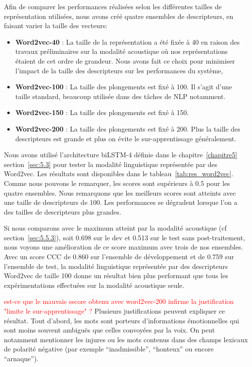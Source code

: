 Afin de comparer les performances réalisées selon les différentes tailles de représentation utilisées, nous avons créé quatre ensembles de descripteurs, en faisant varier la taille des vecteurs:
\begin{itemize}
  \item \textbf{Word2vec-40} : La taille de la représentation a été fixée à 40 en raison des travaux préliminaires sur la modalité acoustique où nos représentations étaient de cet ordre de grandeur. Nous avons fait ce choix pour minimiser l'impact de la taille des descripteurs sur les performances du système,
  \item \textbf{Word2vec-100} : La taille des plongements est fixé à 100. Il s'agit d'une taille standard, beaucoup utilisée dans des tâches de NLP notamment.
  \item \textbf{Word2vec-150} : La taille des plongements est fixé à 150.
  \item \textbf{Word2vec-200} : La taille des plongements est fixé à 200. Plus la taille des descripteurs est grande et plus on évite le sur-apprentissage généralement.
\end{itemize}

Nous avons utilisé l'architecture biLSTM-4 définie dans le chapitre~\ref{chapitre5} section~\ref{sec:5.3} pour tester la modalité linguistique représentée par des Word2vec. Les résultats sont disponibles dans le tableau~\ref{tab:res_word2vec}. Comme nous pouvons le remarquer, les scores sont supérieurs à 0.5 pour les quatre ensembles. Nous remarquons que les meilleurs scores sont atteints avec une taille de descripteurs de 100. Les performances se dégradent lorsque l'on a des tailles de descripteurs plus grandes.

Si nous comparons avec le maximum atteint par la modalité acoustique (cf section~\ref{sec:5.5.3}), soit 0.698 sur le dev et 0.513 sur le test sans post-traitement, nous voyons une amélioration de ce score maximum avec trois de nos ensembles. Avec un score CCC de 0.860 sur l'ensemble de développement et de 0.759 sur l'ensemble de test, la modalité linguistique représentée par des descripteurs Word2vec de taille 100 donne un résultat bien plus performant que tous les expérimentations effectuées sur la modalité acoustique seule.


\textcolor{red}{est-ce que le mauvais sscore obtenu avec word2vec-200 infirme la justification "limite le sur-apprentissage" ?}
Plusieurs justifications peuvent expliquer ce résultat. Tout d'abord, les mots sont porteurs d'informations émotionnelles qui sont moins souvent ambiguës que celles convoyées par la voix. On peut notamment mentionner les injures ou les mots contenus dans des champs lexicaux de polarité négative (par exemple ``inadmissible'', ``honteux'' ou encore ``arnaque'').

